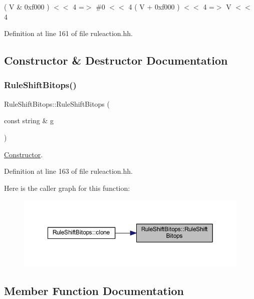 {\ttfamily ( V \& 0xf000 ) $<$$<$ 4 =$>$ \#0 $<$$<$ 4} {\ttfamily ( V + 0xf000 ) $<$$<$ 4 =$>$ V $<$$<$ 4} 

Definition at line 161 of file ruleaction.\+hh.



\subsection{Constructor \& Destructor Documentation}
\mbox{\label{class_rule_shift_bitops_a559ffb30cb703a9f691c6230087eaa19}} 
\subsubsection{\texorpdfstring{RuleShiftBitops()}{RuleShiftBitops()}}
{\footnotesize\ttfamily Rule\+Shift\+Bitops\+::\+Rule\+Shift\+Bitops (\begin{DoxyParamCaption}\item[{const string \&}]{g }\end{DoxyParamCaption})\hspace{0.3cm}{\ttfamily [inline]}}



\mbox{\hyperlink{class_constructor}{Constructor}}. 



Definition at line 163 of file ruleaction.\+hh.

Here is the caller graph for this function\+:
\nopagebreak
\begin{figure}[H]
\begin{center}
\leavevmode
\includegraphics[width=350pt]{class_rule_shift_bitops_a559ffb30cb703a9f691c6230087eaa19_icgraph}
\end{center}
\end{figure}


\subsection{Member Function Documentation}
\mbox{\label{class_rule_shift_bitops_acdfd1b4d0a22a3e8f15d632e810d5737}} 
